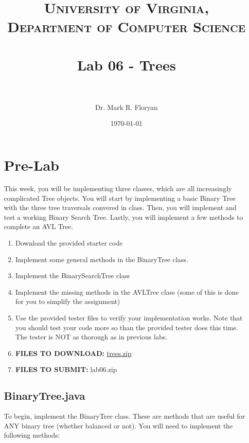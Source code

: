 \documentclass[paper=a4, fontsize=11pt, parskip=full]{scrartcl} %
\title{
\normalfont \normalsize
\textsc{University of Virginia, Department of Computer Science} \\ [25pt] %
\horrule{0.5pt} \\[0.4cm] %
\huge Lab 06 - Trees \\ %
\horrule{2pt} \\[0.5cm] %
}
\author{Dr. Mark R. Floryan} %
\date{\normalsize\today} %
\numberwithin{equation}{section} %
\numberwithin{figure}{section} %
\numberwithin{table}{section} %
\begin{document}
\maketitle %


\section{Pre-Lab}

This week, you will be implementing three classes, which are all increasingly complicated Tree objects. You will start by implementing a basic Binary Tree with the three tree traversals convered in class. Then, you will implement and test a working Binary Search Tree. Lastly, you will implement a few methods to complete an AVL Tree.

\begin{enumerate}
	\item Download the provided starter code
	\item Implement some general methods in the BinaryTree class.
	\item Implement the BinarySearchTree class
	\item Implement the missing methods in the AVLTree class (some of this is done for you to simplify the assignment)
	\item Use the provided tester files to verify your implementation works. Note that you should test your code more so than the provided tester does this time. The tester is NOT as thorough as in previous labs.
	\item \textbf{FILES TO DOWNLOAD:} \href{https://markfloryan.github.io/dsa1/labs/lab06%20-%20Trees/code/trees.zip}{trees.zip}
	\item \textbf{FILES TO SUBMIT:} lab06.zip
\end{enumerate}


\subsection{BinaryTree.java}

To begin, implement the BinaryTree class. These are methods that are useful for ANY binary tree (whether balanced or not). You will need to implement the following methods:
\end{document}
